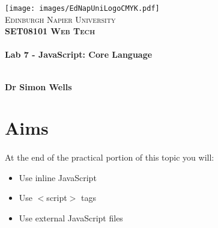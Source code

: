 \documentclass[10pt, a4paper]{article}
\begin{document}

\begin{titlepage}
\vspace*{5cm}
\begin{center}
\texttt{[image: images/EdNapUniLogoCMYK.pdf]}~\\[1cm]

\textsc{\Large Edinburgh Napier University}\\[1.5cm]

\textsc{\LARGE \bfseries SET08101 Web Tech}\\[0.5cm]

\hrulefill \\[0.4cm]
{\huge \bfseries Lab 7 - JavaScript: Core Language \\[0.4cm] }
\hrulefill \\[1.5cm]

\begin{minipage}{0.4\textwidth}
\begin{flushleft} \large
\textbf{Dr Simon Wells} \\
\end{flushleft}
\end{minipage}

\vfill

\end{center}
\end{titlepage}




%

\section{Aims}
\paragraph{} At the end of the practical portion of this topic you will:

\begin{itemize}
\item Use inline JavaScript
\item Use $<$script$>$ tags
\item Use external JavaScript files
\end{itemize}
\end{document}
